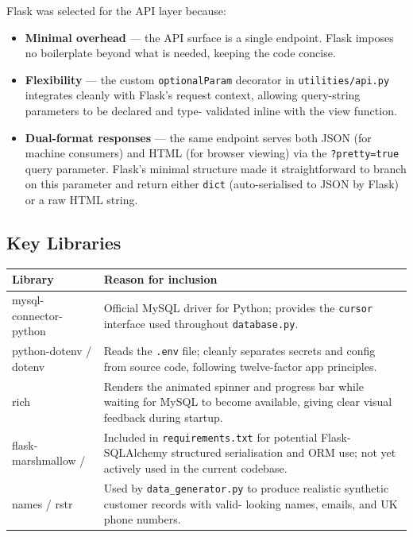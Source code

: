 \documentclass[12pt,a4paper]{article}
\begin{document}
Flask was selected for the API layer because:

\begin{itemize}[leftmargin=2em]
    \item \textbf{Minimal overhead} --- the API surface is a single endpoint.
          Flask imposes no boilerplate beyond what is needed, keeping the code
          concise.
    \item \textbf{Flexibility} --- the custom \texttt{optionalParam} decorator
          in \texttt{utilities/api.py} integrates cleanly with Flask's request
          context, allowing query-string parameters to be declared and type-
          validated inline with the view function.
    \item \textbf{Dual-format responses} --- the same endpoint serves both JSON
          (for machine consumers) and HTML (for browser viewing) via the
          \texttt{?pretty=true} query parameter. Flask's minimal structure made
          it straightforward to branch on this parameter and return either
          \texttt{dict} (auto-serialised to JSON by Flask) or a raw HTML string.
\end{itemize}

\subsection{Key Libraries}

\begin{center}
\begin{tabular}{>{\ttfamily}l p{10cm}}
\toprule
\textbf{Library} & \textbf{Reason for inclusion} \\
\midrule
mysql-connector-python & Official MySQL driver for Python; provides the
                          \texttt{cursor} interface used throughout
                          \texttt{database.py}. \\[0.4em]
python-dotenv / dotenv & Reads the \texttt{.env} file; cleanly separates
                          secrets and config from source code, following
                          twelve-factor app principles. \\[0.4em]
rich                   & Renders the animated spinner and progress bar while
                          waiting for MySQL to become available, giving clear
                          visual feedback during startup. \\[0.4em]
flask-marshmallow /    & Included in \texttt{requirements.txt} for potential
Flask-SQLAlchemy         structured serialisation and ORM use; not yet
                          actively used in the current codebase. \\[0.4em]
names / rstr           & Used by \texttt{data\_generator.py} to produce
                          realistic synthetic customer records with valid-
                          looking names, emails, and UK phone numbers. \\
\bottomrule
\end{tabular}
\end{center}
\end{document}

